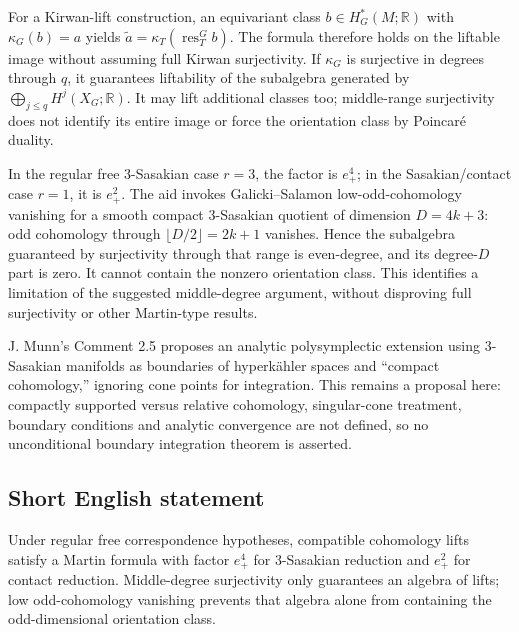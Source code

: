 \documentclass[11pt]{article}
\newcommand{\R}{\mathbb{R}}
\begin{document}
For a Kirwan-lift construction, an equivariant class \(b\in H_G^*(M;\R)\) with \(\kappa_G(b)=a\) yields
\(\widetilde a=\kappa_T(\operatorname{res}_T^G b)\). The formula therefore holds on the liftable image without assuming full Kirwan surjectivity. If \(\kappa_G\) is surjective in degrees through \(q\), it guarantees liftability of the subalgebra generated by \(\bigoplus_{j\leq q}H^j(X_G;\R)\). It may lift additional classes too; middle-range surjectivity does not identify its entire image or force the orientation class by Poincaré duality.

In the regular free 3-Sasakian case \(r=3\), the factor is \(e_+^4\); in the Sasakian/contact case \(r=1\), it is \(e_+^2\). The aid invokes Galicki--Salamon low-odd-cohomology vanishing for a smooth compact 3-Sasakian quotient of dimension \(D=4k+3\): odd cohomology through \(\lfloor D/2\rfloor=2k+1\) vanishes. Hence the subalgebra guaranteed by surjectivity through that range is even-degree, and its degree-\(D\) part is zero. It cannot contain the nonzero orientation class. This identifies a limitation of the suggested middle-degree argument, without disproving full surjectivity or other Martin-type results.

J. Munn's Comment 2.5 proposes an analytic polysymplectic extension using 3-Sasakian manifolds as boundaries of hyperkähler spaces and ``compact cohomology,'' ignoring cone points for integration. This remains a proposal here: compactly supported versus relative cohomology, singular-cone treatment, boundary conditions and analytic convergence are not defined, so no unconditional boundary integration theorem is asserted.
\subsection{Short English statement}
Under regular free correspondence hypotheses, compatible cohomology lifts satisfy a Martin formula with factor \(e_+^4\) for 3-Sasakian reduction and \(e_+^2\) for contact reduction. Middle-degree surjectivity only guarantees an algebra of lifts; low odd-cohomology vanishing prevents that algebra alone from containing the odd-dimensional orientation class.
\end{document}
